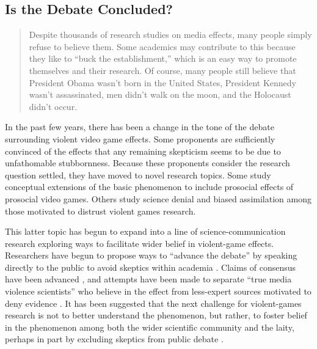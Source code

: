 \documentclass[man]{apa6}
\begin{document}
\subsection{Is the Debate Concluded?}
\begin{quote}
Despite thousands of research studies on media effects, many people simply refuse to believe them. Some academics may contribute to this because they like to ``buck the establishment,'' which is an easy way to promote themselves and their research. Of course, many people still believe that President Obama wasn't born in the United States, President Kennedy wasn't assassinated, men didn't walk on the moon, and the Holocaust didn't occur. \citep[p. 572]{Strasburger:etal:2014}
\end{quote}

In the past few years, there has been a change in the tone of the debate surrounding violent video game effects. Some proponents are sufficiently convinced of the effects that any remaining skepticism seems to be due to unfathomable stubbornness. Because these proponents consider the research question settled, they have moved to novel research topics. Some study conceptual extensions of the basic phenomenon to include prosocial effects of prosocial video games. Others study science denial and biased assimilation among those motivated to distrust violent games research. 

This latter topic has begun to expand into a line of science-communication research exploring ways to facilitate wider belief in violent-game effects.   Researchers have begun to propose ways to ``advance the debate'' by speaking directly to the public to avoid skeptics within academia \citep{Strasburger:Donnerstein:2014}. Claims of consensus have been advanced \citep{Bushman:etal:2014}, and attempts have been made to separate ``true media violence scientists'' who believe in the effect from less-expert sources motivated to deny evidence \citep{Anderson:etal:2014}. It has been suggested that the next challenge for violent-games research is not to better understand the phenomenon, but rather, to foster belief in the phenomenon among both the wider scientific community and the laity, perhaps in part by excluding skeptics from public debate \citep{Anderson:etal:2014}.
\end{document}
